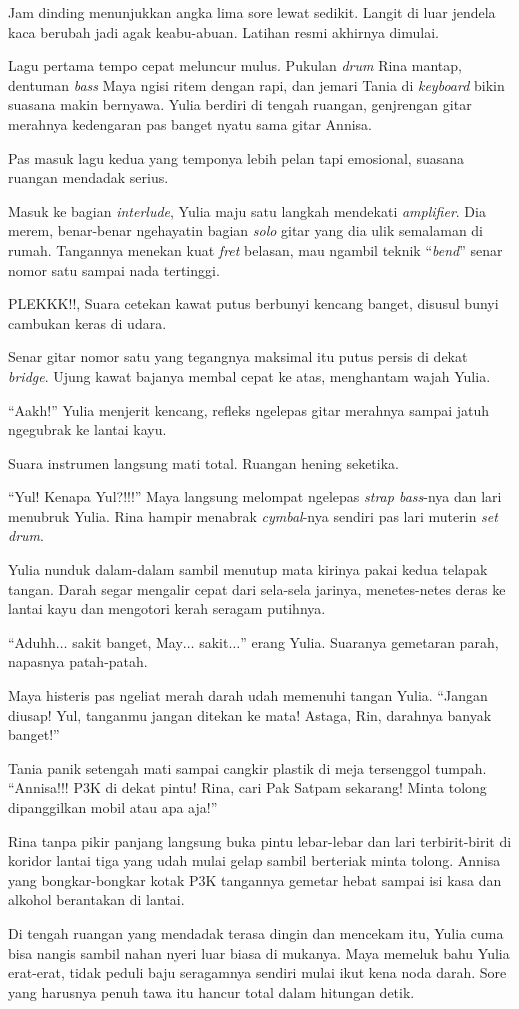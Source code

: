 Jam dinding menunjukkan angka lima sore lewat sedikit. Langit di luar jendela kaca berubah jadi agak keabu-abuan. Latihan resmi akhirnya dimulai.

Lagu pertama tempo cepat meluncur mulus. Pukulan \textit{drum} Rina mantap, dentuman \textit{bass} Maya ngisi ritem dengan rapi, dan jemari Tania di \textit{keyboard} bikin suasana makin bernyawa. Yulia berdiri di tengah ruangan, genjrengan gitar merahnya kedengaran pas banget nyatu sama gitar Annisa.

Pas masuk lagu kedua yang temponya lebih pelan tapi emosional, suasana ruangan mendadak serius.

Masuk ke bagian \textit{interlude}, Yulia maju satu langkah mendekati \textit{amplifier}. Dia merem, benar-benar ngehayatin bagian \textit{solo} gitar yang dia ulik semalaman di rumah. Tangannya menekan kuat \textit{fret} belasan, mau ngambil teknik ``\textit{bend}'' senar nomor satu sampai nada tertinggi.

PLEKKK!!, Suara cetekan kawat putus berbunyi kencang banget, disusul bunyi cambukan keras di udara.

Senar gitar nomor satu yang tegangnya maksimal itu putus persis di dekat \textit{bridge}. Ujung kawat bajanya membal cepat ke atas, menghantam wajah Yulia.

``Aakh!'' Yulia menjerit kencang, refleks ngelepas gitar merahnya sampai jatuh ngegubrak ke lantai kayu.

Suara instrumen langsung mati total. Ruangan hening seketika.

``Yul! Kenapa Yul?!!!'' Maya langsung melompat ngelepas \textit{strap bass}-nya dan lari menubruk Yulia. Rina hampir menabrak \textit{cymbal}-nya sendiri pas lari muterin \textit{set drum}.

Yulia nunduk dalam-dalam sambil menutup mata kirinya pakai kedua telapak tangan. Darah segar mengalir cepat dari sela-sela jarinya, menetes-netes deras ke lantai kayu dan mengotori kerah seragam putihnya.

``Aduhh$\dots$ sakit banget, May$\dots$ sakit$\dots$'' erang Yulia. Suaranya gemetaran parah, napasnya patah-patah.

Maya histeris pas ngeliat merah darah udah memenuhi tangan Yulia. ``Jangan diusap! Yul, tanganmu jangan ditekan ke mata! Astaga, Rin, darahnya banyak banget!''

Tania panik setengah mati sampai cangkir plastik di meja tersenggol tumpah. ``Annisa!!! P3K di dekat pintu! Rina, cari Pak Satpam sekarang! Minta tolong dipanggilkan mobil atau apa aja!''

Rina tanpa pikir panjang langsung buka pintu lebar-lebar dan lari terbirit-birit di koridor lantai tiga yang udah mulai gelap sambil berteriak minta tolong. Annisa yang bongkar-bongkar kotak P3K tangannya gemetar hebat sampai isi kasa dan alkohol berantakan di lantai.

Di tengah ruangan yang mendadak terasa dingin dan mencekam itu, Yulia cuma bisa nangis sambil nahan nyeri luar biasa di mukanya. Maya memeluk bahu Yulia erat-erat, tidak peduli baju seragamnya sendiri mulai ikut kena noda darah. Sore yang harusnya penuh tawa itu hancur total dalam hitungan detik.

\jedahias
